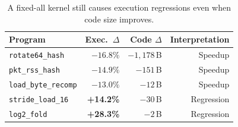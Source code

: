 \begin{table}[t]
  \centering
  \caption{A fixed-all kernel still causes execution regressions even when code size improves.}
  \label{tab:motivation_fixed_all}
  \small
  \begin{tabular}{lrrr}
    \toprule
    Program & Exec.\ $\Delta$ & Code $\Delta$ & Interpretation \\
    \midrule
    \texttt{rotate64\_hash}     & $-16.8\%$ & $-1{,}178$\,B & Speedup \\
    \texttt{pkt\_rss\_hash}     & $-14.9\%$ & $-151$\,B     & Speedup \\
    \texttt{load\_byte\_recomp} & $-13.0\%$ & $-12$\,B      & Speedup \\
    \texttt{stride\_load\_16}   & \textbf{+14.2\%} & $-30$\,B & Regression \\
    \texttt{log2\_fold}         & \textbf{+28.3\%} & $-2$\,B  & Regression \\
    \bottomrule
  \end{tabular}
\end{table}